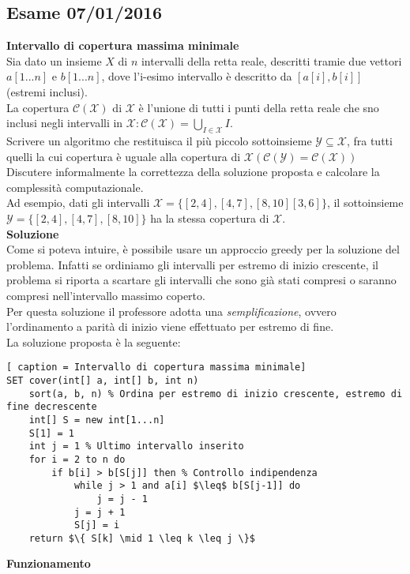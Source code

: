 \documentclass[../cheatSheetAlgoritmi.tex]{subfiles}
\begin{document}
\subsection{Esame 07/01/2016}
\textbf{Intervallo di copertura massima minimale} \\
Sia dato un insieme $X$ di $n$ intervalli della retta reale, descritti tramie due vettori $a[1...n]$ e $b[1...n]$, dove l'i-esimo intervallo è descritto da $[ a[i], b[i] ]$ (estremi inclusi). \\
La copertura $\mathcal{C(X)}$ di $\mathcal{X}$ è l'unione di tutti i punti della retta reale che sno inclusi negli intervalli in $\mathcal{X} : \mathcal{C(X)} = \bigcup_{I \in \mathcal{X}} I$. \\
Scrivere un algoritmo che restituisca il più piccolo sottoinsieme $\mathcal{Y} \subseteq \mathcal{X}$, fra tutti quelli la cui copertura è uguale alla copertura di $\mathcal{X (C(Y) =C(X))}$ \\
Discutere informalmente la correttezza della soluzione proposta e calcolare la complessità computazionale. \\
Ad esempio, dati gli intervalli $\mathcal{X} = \{[2,4], [4,7], [8,10] [3,6]\}$, il sottoinsieme $\mathcal{Y}= \{[2,4], [4,7], [8,10]\}$ ha la stessa copertura di $\mathcal{X}$. \\
\textbf{Soluzione} \\
Come si poteva intuire, è possibile usare un approccio greedy per la soluzione del problema. Infatti se ordiniamo gli intervalli per estremo di inizio crescente, il problema si riporta a scartare gli intervalli che sono già stati compresi o saranno compresi nell'intervallo massimo coperto. \\
Per questa soluzione il professore adotta una \emph{semplificazione}, ovvero l'ordinamento a parità di inizio viene effettuato per estremo di fine. \\
La soluzione proposta è la seguente: 
\begin{lstlisting}[ caption = Intervallo di copertura massima minimale]
SET cover(int[] a, int[] b, int n)
	sort(a, b, n) % Ordina per estremo di inizio crescente, estremo di fine decrescente
	int[] S = new int[1...n]
	S[1] = 1
	int j = 1 % Ultimo intervallo inserito
	for i = 2 to n do
		if b[i] > b[S[j]] then % Controllo indipendenza
			while j > 1 and a[i] $\leq$ b[S[j-1]] do
				j = j - 1
			j = j + 1
			S[j] = i
	return $\{ S[k] \mid 1 \leq k \leq j \}$ 
\end{lstlisting}
\textbf{Funzionamento} \\
\end{document}
